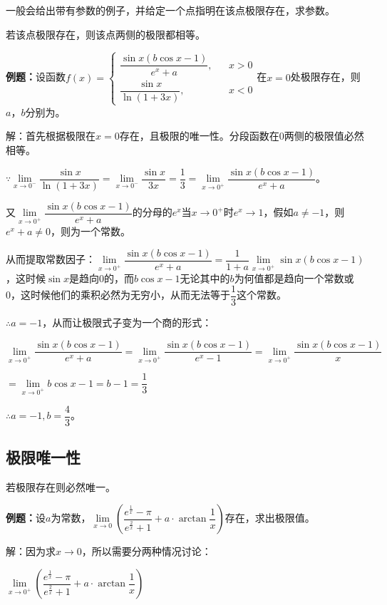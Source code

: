 一般会给出带有参数的例子，并给定一个点指明在该点极限存在，求参数。

若该点极限存在，则该点两侧的极限都相等。\medskip

\textbf{例题：}设函数$f(x)=\left\{\begin{array}{lcl}
    \dfrac{\sin x(b\cos x-1)}{e^x+a}, & & x>0 \\
    \dfrac{\sin x}{\ln(1+3x)}, & & x<0
\end{array}
\right.$在$x=0$处极限存在，则$a$，$b$分别为。

解：首先根据极限在$x=0$存在，且极限的唯一性。分段函数在0两侧的极限值必然相等。

$\because\lim\limits_{x\to 0^-}\dfrac{\sin x}{\ln(1+3x)}=\lim\limits_{x\to 0^-}\dfrac{\sin x}{3x}=\dfrac{1}{3}=\lim\limits_{x\to 0^+}\dfrac{\sin x(b\cos x-1)}{e^x+a}$。

\medskip

又$\lim\limits_{x\to 0^+}\dfrac{\sin x(b\cos x-1)}{e^x+a}$的分母的$e^x$当$x\to 0^+$时$e^x\to 1$，假如$a\neq-1$，则$e^x+a\neq 0$，则为一个常数。

从而提取常数因子：$\lim\limits_{x\to 0^+}\dfrac{\sin x(b\cos x-1)}{e^x+a}=\dfrac{1}{1+a}\lim\limits_{x\to 0^+}\sin x(b\cos x-1)$，这时候$\sin x$是趋向0的，而$b\cos x-1$无论其中的$b$为何值都是趋向一个常数或0，这时候他们的乘积必然为无穷小，从而无法等于$\dfrac{1}{3}$这个常数。

$\therefore a=-1$，从而让极限式子变为一个商的形式：\medskip

$\lim\limits_{x\to 0^+}\dfrac{\sin x(b\cos x-1)}{e^x+a}=\lim\limits_{x\to 0^+}\dfrac{\sin x(b\cos x-1)}{e^x-1}=\lim\limits_{x\to 0^+}\dfrac{\sin x(b\cos x-1)}{x}$\medskip

$=\lim\limits_{x\to 0^+}b\cos x-1=b-1=\dfrac{1}{3}$\medskip

$\therefore a=-1,b=\dfrac{4}{3}$。

\subsection{极限唯一性}

若极限存在则必然唯一。

\textbf{例题：}设$a$为常数，$\lim\limits_{x\to 0}\left(\dfrac{e^{\frac{1}{x}}-\pi}{e^{\frac{2}{x}}+1}+a\cdot\arctan\dfrac{1}{x}\right)$存在，求出极限值。

解：因为求$x\to 0$，所以需要分两种情况讨论：

\medskip

$\lim\limits_{x\to 0^+}\left(\dfrac{e^{\frac{1}{x}}-\pi}{e^{\frac{2}{x}}+1}+a\cdot\arctan\dfrac{1}{x}\right)$

